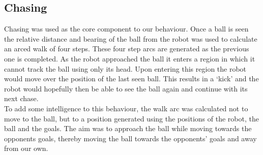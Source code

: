\subsection{Chasing}
Chasing was used as the core component to our behaviour. Once a ball is seen the relative distance and bearing of the ball from the robot was used to calculate an arced walk of four steps. These four step arcs are generated as the previous one is completed. As the robot approached the ball it enters a region in which it cannot track the ball using only its head. Upon entering this region the robot would move over the position of the last seen ball. This results in a `kick' and the robot would hopefully then be able to see the ball again and continue with its next chase.\\ 

To add some intelligence to this behaviour, the walk arc was calculated not to move to the ball, but to a position generated using the positions of the robot, the ball and the goals. The aim was to approach the ball while moving towards the opponents goals, thereby moving the ball towards the opponents' goals and away from our own.\\